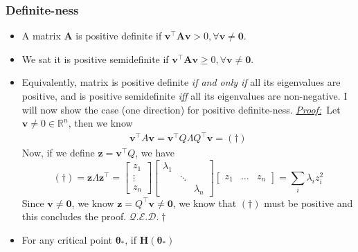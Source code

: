 \documentclass[11pt]{article}
\newcommand{\bv}{\mathbf{v}}
\newcommand{\bz}{\mathbf{z}}
\newcommand{\bzero}{\mathbf{0}}
\newcommand{\proof}{\tit{\underline{Proof:}}} %
\newcommand{\qed}{\hfill $\mathcal{Q}.\mathcal{E}.\mathcal{D}.\dagger$}
\newcommand{\real}{\mathbb{R}}
\newcommand{\tit}[1]{\textit{#1}}
\begin{document}
\subsubsection{Definite-ness}
\begin{itemize}
    \item A matrix $\mathbf{A}$ is positive definite if $\bv^\top\mathbf{A}\bv > 0, \forall \bv \neq \bzero$.
    \item We sat it is positive semidefinite if $\bv^\top\mathbf{A}\bv \geq 0, \forall \bv \neq \bzero$.
    \item Equivalently, matrix is positive definite \textit{if and only if} all its eigenvalues are positive, and is positive semidefinite \textit{iff} all its eigenvalues are non-negative. I will now show the case (one direction) for positive definite-ness. \newline \proof\, Let $\bv \neq 0 \in \real^n$, then we know 
    \begin{align}
        \bv^\top A \bv 
        = \bv^\top Q\Lambda Q^\top \bv = (\dag)
    \end{align}
    Now, if we define $\bz = \bv^\top Q$, we have
    \begin{equation}
        (\dag) = \bz \Lambda \bz^\top
        = \begin{bmatrix}
            z_1 \\ \vdots \\ z_n
        \end{bmatrix}\begin{bmatrix}
            \lambda_1 & & \\
            & \ddots & \\
            & & \lambda_n
        \end{bmatrix}\begin{bmatrix}
            z_1 & \dots & z_n
        \end{bmatrix}
        = \sum_i \lambda_i z_i^2
    \end{equation}
    Since $\bv \neq \bzero$, we know $\bz = Q^\top \bv \neq \bzero$, we know that $(\dag)$ must be positive and this concludes the proof. \qed
    \item For any critical point $\boldsymbol{\theta}_*$, if $\mathbf{H}(\boldsymbol{\theta}_*)$ 
\end{itemize}
\end{document}
